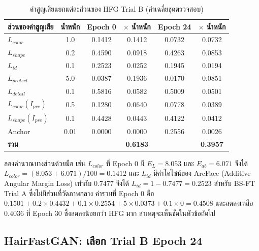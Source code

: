 \begin{table}[!htbp]
\centering
\caption{ค่าสูญเสียแยกแต่ละส่วนของ HFG Trial B (ค่าเฉลี่ยชุดตรวจสอบ)}
\label{tab:loss_example}
\begin{tabular}{|l|c|c|c|c|c|}
\hline
\textbf{ส่วนของค่าสูญเสีย} & \textbf{น้ำหนัก} & \textbf{Epoch 0} & \textbf{$\times$ น้ำหนัก}
& \textbf{Epoch 24} & \textbf{$\times$ น้ำหนัก} \\ \hline
$L_{color}$ & 1.0 & 0.1412 & 0.1412 & 0.0732 & 0.0732 \\ \hline
$L_{shape}$ & 0.2 & 0.4590 & 0.0918 & 0.4263 & 0.0853 \\ \hline
$L_{id}$ & 0.1 & 0.2523 & 0.0252 & 0.1945 & 0.0194 \\ \hline
$L_{protect}$ & 5.0 & 0.0387 & 0.1936 & 0.0170 & 0.0851 \\ \hline
$L_{detail}$ & 0.1 & 0.5816 & 0.0582 & 0.5009 & 0.0501 \\ \hline
$L_{color}(I_{pre})$ & 0.5 & 0.1280 & 0.0640 & 0.0778 & 0.0389 \\ \hline
$L_{shape}(I_{pre})$ & 0.1 & 0.4428 & 0.0443 & 0.4122 & 0.0412 \\ \hline
Anchor & 0.01 & 0.0000 & 0.0000 & 0.2556 & 0.0026 \\ \hline
\textbf{รวม} & & & \textbf{0.6183} & & \textbf{0.3957} \\ \hline
\end{tabular}
\par\vspace{3pt}{\footnotesize\raggedright หมายเหตุ: HFG = HairFastGAN\par}

\end{table}

ลองคำนวณบางส่วนด้วยมือ เช่น $L_{color}$ ที่ Epoch 0 มี $E_L = 8.053$ และ $E_{ab} = 6.071$
จึงได้ $L_{color} = (8.053 + 6.071)/100 = 0.1412$
และ $L_{id}$ มีค่าโคไซน์ของ ArcFace (Additive Angular Margin Loss) เท่ากับ 0.7477 จึงได้ $L_{id} = 1 - 0.7477 = 0.2523$
สำหรับ BS-FT Trial A ซึ่งไม่มีส่วนที่วัดภาพกลาง ค่ารวมที่ Epoch 0 คือ
$0.1501 + 0.2 \times 0.4432 + 0.1 \times 0.2554 + 5 \times 0.0373 + 0.1 \times 0 = 0.4508$
และลดลงเหลือ 0.4036 ที่ Epoch 30 ซึ่งลดลงน้อยกว่า HFG มาก สาเหตุจะเห็นชัดในหัวข้อถัดไป

\subsection{HairFastGAN: เลือก Trial B Epoch 24}

